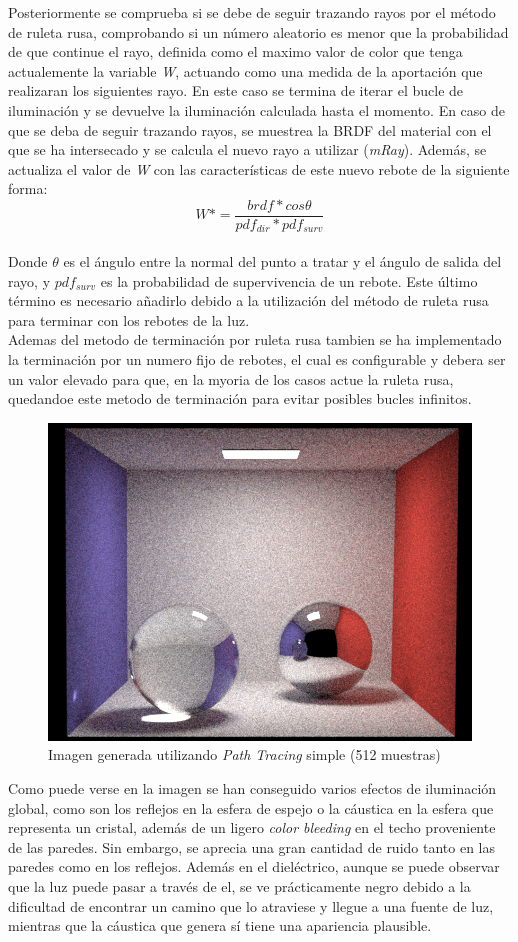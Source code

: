 \documentclass[10pt,oneside,a4paper]{article}
\begin{document}
Posteriormente se comprueba si se debe de seguir trazando rayos por el método de ruleta rusa, comprobando si un número aleatorio es menor que la probabilidad de que continue el rayo, definida como el maximo valor de color que tenga actualemente la variable \textit{W}, actuando como una medida de la aportación que realizaran los siguientes rayo. En este caso se termina de iterar el bucle de iluminación y se devuelve la iluminación calculada hasta el momento. En caso de que se deba de seguir trazando rayos, se muestrea la BRDF del material con el que se ha intersecado y se calcula el nuevo rayo a utilizar (\textit{mRay}). Además, se actualiza el valor de \textit{W} con las características de este nuevo rebote de la siguiente forma:
$$W *= \frac{brdf * cos\theta}{pdf_{dir} * pdf_{surv}}$$\\

Donde $\theta$ es el ángulo entre la normal del punto a tratar y el ángulo de salida del rayo, y $pdf_{surv}$ es la probabilidad de supervivencia de un rebote. Este último término es necesario añadirlo debido a la utilización del método de ruleta rusa para terminar con los rebotes de la luz.\\

Ademas del metodo de terminación por ruleta rusa tambien se ha implementado la terminación por un numero fijo de rebotes, el cual es configurable y debera ser un valor elevado para que, en la myoria de los casos actue la ruleta rusa, quedandoe este metodo de terminación para evitar posibles bucles infinitos.\\

\begin{figure}[h]
\centering
\includegraphics[width=.6\linewidth]{images/cbox_path_512.png}
\caption{Imagen generada utilizando \textit{Path Tracing} simple (512 muestras)}
\label{fig:disp}
\end{figure}

Como puede verse en la imagen se han conseguido varios efectos de iluminación global, como son los reflejos en la esfera de espejo o la cáustica en la esfera que representa un cristal, además de un ligero \textit{color bleeding} en el techo proveniente de las paredes. Sin embargo, se aprecia una gran cantidad de ruido tanto en las paredes como en los reflejos. Además en el dieléctrico, aunque se puede observar que la luz puede pasar a través de el, se ve prácticamente negro debido a la dificultad de encontrar un camino que lo atraviese y llegue a una fuente de luz, mientras que la cáustica que genera sí tiene una apariencia plausible.\\
\end{document}
